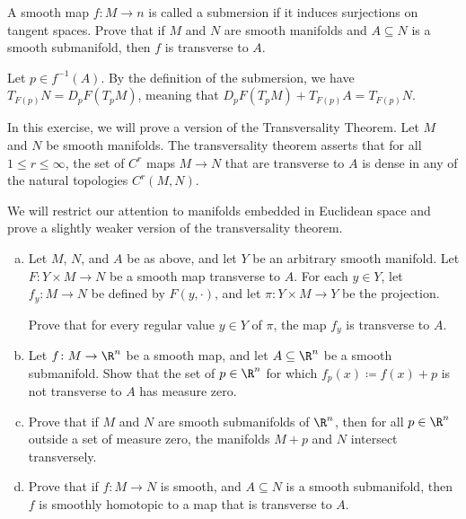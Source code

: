 \documentclass[10pt]{mypackage}
\begin{document}
\begin{problem}[Problem 5]
  A smooth map $f\colon M\rightarrow n$ is called a submersion if it induces surjections on tangent spaces. Prove that if $M$ and $N$ are smooth manifolds and $A\subseteq N$ is a smooth submanifold, then $f$ is transverse to $A$.
\end{problem}
\begin{solution}
  Let $p\in f^{-1}\left( A \right)$. By the definition of the submersion, we have $T_{F(p)}N = D_pF\left( T_pM \right)$, meaning that $D_pF\left( T_pM \right) + T_{F(p)}A = T_{F(p)}N$.
\end{solution}
\begin{problem}[Problem 6]
  In this exercise, we will prove a version of the Transversality Theorem. Let $M$ and $N$ be smooth manifolds. The transversality theorem asserts that for all $1\leq r \leq \infty$, the set of $C^{r}$ maps $M\rightarrow N$ that are transverse to $A$ is dense in any of the natural topologies $C^{r}\left( M,N \right)$.\newline

  We will restrict our attention to manifolds embedded in Euclidean space and prove a slightly weaker version of the transversality theorem.
  \begin{enumerate}[(a)]
    \item Let $M$, $N$, and $A$ be as above, and let $Y$ be an arbitrary smooth manifold. Let $F\colon Y\times M\rightarrow N$ be a smooth map transverse to $A$. For each $y\in Y$, let $f_y\colon M\rightarrow N$ be defined by $F\left( y,\cdot \right)$, and let $\pi\colon Y\times M\rightarrow Y$ be the projection.\newline

      Prove that for every regular value $y\in Y$ of $\pi$, the map $f_y$ is transverse to $A$.
    \item Let $f\colon M\rightarrow \R^{n}$ be a smooth map, and let $A\subseteq \R^{n}$ be a smooth submanifold. Show that the set of $p\in \R^{n}$ for which $f_p(x) \coloneq f(x) + p$ is not transverse to $A$ has measure zero.
    \item Prove that if $M$ and $N$ are smooth submanifolds of $\R^n$, then for all $p\in \R^{n}$ outside a set of measure zero, the manifolds $M + p$ and $N$ intersect transversely.
    \item Prove that if $f\colon M\rightarrow N$ is smooth, and $A\subseteq N$ is a smooth submanifold, then $f$ is smoothly homotopic to a map that is transverse to $A$.
  \end{enumerate}
\end{problem}
\end{document}
